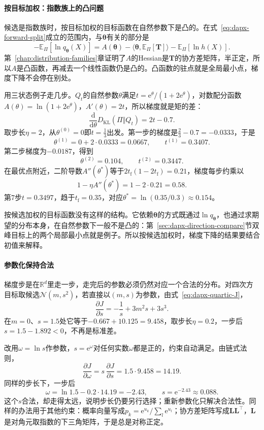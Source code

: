 \paragraph{按目标加权：指数族上的凸问题}
候选是指数族时，按目标加权的目标函数在自然参数下是凸的。在式~\eqref{eq:dapx-forward-split}成立的范围内，与$\bm{\theta}$有关的部分是
\[
 -\mathbb{E}_{\Pi}[\ln q_{\bm{\theta}}(X)]=A(\bm{\theta})-\langle\bm{\theta},\mathbb{E}_{\Pi}[\bm{T}]\rangle-\mathbb{E}_{\Pi}[\ln h(X)] .
\]
第~\ref{chap:distribution-families}章证明了$A$的Hessian是$\bm{T}$的协方差矩阵，半正定，所以$A$是凸函数，再减去一个线性函数仍是凸的。凸函数的驻点就是全局最小点，梯度下降不会停在别处。

用三状态例子走几步。$Q_t$的自然参数$\theta$满足$t=\mathrm{e}^{\theta}/(1+2\mathrm{e}^{\theta})$，对数配分函数$A(\theta)=\ln(1+2\mathrm{e}^{\theta})$，$A'(\theta)=2t$，所以梯度就是矩的差：
\[
 \frac{\mathrm{d}}{\mathrm{d}\theta}D_{\mathrm{KL}}(\Pi\Vert Q_t)=2t-0.7 .
\]
取步长$\eta=2$，从$\theta^{(0)}=0$即$t=\tfrac13$出发。第一步的梯度是$\tfrac23-0.7=-0.0333$，于是
\[
 \theta^{(1)}=0+2\cdot0.0333=0.0667,\qquad t^{(1)}=0.3407 .
\]
第二步梯度为$-0.0187$，得到
\[
 \theta^{(2)}=0.104,\qquad t^{(2)}=0.3447 .
\]
在最优点附近，二阶导数$A''(\theta^{*})$等于$2t_{\mathrm{f}}(1-2t_{\mathrm{f}})=0.21$，梯度每步约乘以
\[
 1-\eta A''(\theta^{*})=1-2\cdot0.21=0.58 .
\]
第$7$步$t=0.3497$，趋于$t_{\mathrm{f}}=0.35$，对应$\theta^{*}=\ln(0.35/0.3)\approx0.154$。

按候选加权的目标函数没有这样的结构。它依赖$\bm{\theta}$的方式既通过$\ln q_{\bm{\theta}}$，也通过求期望的分布本身，在自然参数下一般不是凸的：第~\ref{sec:dapx-direction-compare}节双峰目标上的两个局部最小点就是例子。所以按候选加权时，梯度下降的结果要结合初值来解释。

\paragraph{参数化保持合法}
梯度步是在$\mathbb{R}^{d}$里走一步，走完后的参数必须仍然对应一个合法的分布。对四次方目标取候选$\mathcal{N}(m,s^{2})$，若直接以$(m,s)$为参数，由式~\eqref{eq:dapx-quartic-J}，
\[
 \frac{\partial J}{\partial s}=-\frac1s+3m^{2}s+3s^{3} .
\]
在$m=0$、$s=1.5$处它等于$-0.667+10.125=9.458$，取步长$\eta=0.2$，一步后$s=1.5-1.892<0$，不再是标准差。

改用$\omega=\ln s$作参数，$s=\mathrm{e}^{\omega}$对任何实数$\omega$都是正的，约束自动满足。由链式法则，
\[
 \frac{\partial J}{\partial\omega}=s\,\frac{\partial J}{\partial s}=1.5\cdot9.458=14.19 .
\]
同样的步长下，一步后
\[
 \omega=\ln1.5-0.2\cdot14.19=-2.43,\qquad s=\mathrm{e}^{-2.43}\approx0.088 .
\]
这个$s$合法，却走得太远，说明步长仍要另行选择；重新参数化只解决合法性。同样的办法用于其他约束：概率向量写成$p_k=\mathrm{e}^{u_k}/\sum_l\mathrm{e}^{u_l}$；协方差矩阵写成$\bm{L}\bm{L}^{\top}$，$\bm{L}$是对角元取指数的下三角矩阵，于是总是对称正定。

